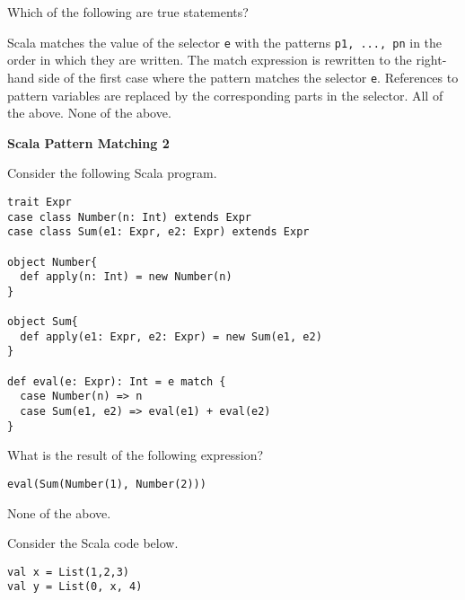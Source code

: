\begin{questions}
Which of the following are true statements?

\begin{checkboxes}
\choice Scala matches the value of the selector \texttt{e} with the patterns \texttt{p1, ..., pn} in the order in which they are written.
\choice The match expression is rewritten to the right-hand side of the first case where the pattern matches the selector \texttt{e}.
\choice References to pattern variables are replaced by the corresponding parts in the selector.
\CorrectChoice All of the above.
\choice None of the above.
\end{checkboxes}


\question  \textbf{Scala Pattern Matching 2}

Consider the following Scala program.

\begin{verbatim}
trait Expr
case class Number(n: Int) extends Expr
case class Sum(e1: Expr, e2: Expr) extends Expr

object Number{
  def apply(n: Int) = new Number(n)
}

object Sum{
  def apply(e1: Expr, e2: Expr) = new Sum(e1, e2)
}

def eval(e: Expr): Int = e match {
  case Number(n) => n
  case Sum(e1, e2) => eval(e1) + eval(e2)
}
\end{verbatim}

What is the result of the following expression?

\begin{verbatim}
eval(Sum(Number(1), Number(2)))
\end{verbatim}

\begin{oneparcheckboxes}
\choice None of the above.
\end{oneparcheckboxes}



\question Consider the Scala code below.

\begin{verbatim}
val x = List(1,2,3)
val y = List(0, x, 4)
\end{verbatim}

\end{questions}
